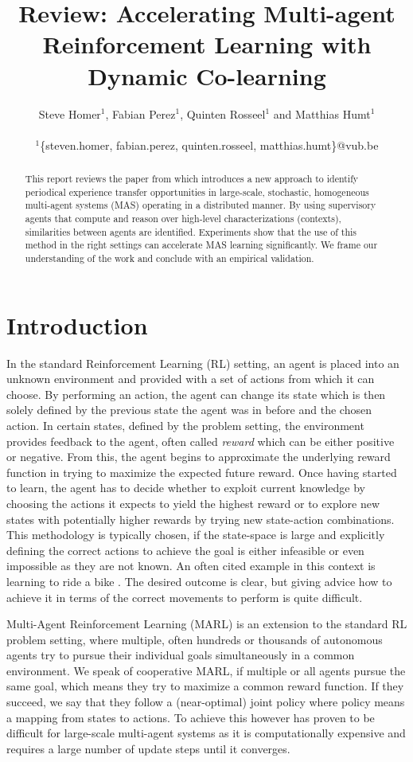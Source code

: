 \documentclass[letterpaper]{article}
\title{Review: Accelerating Multi-agent Reinforcement Learning
with Dynamic Co-learning}
\author{Steve Homer$^1$, Fabian Perez$^1$, Quinten Rosseel$^1$ and Matthias Humt$^1$ \\
\mbox{}\\
$^1$\{steven.homer, fabian.perez, quinten.rosseel, matthias.humt\}@vub.be}
\begin{document}
\maketitle

\begin{abstract} \label{sec:abstract}
 This report reviews the paper from \cite{garant2015accelerating} which introduces a new approach to identify periodical experience transfer opportunities in large-scale, stochastic, homogeneous multi-agent systems (MAS) operating in a distributed manner. By using supervisory agents that compute and reason over high-level characterizations (contexts), similarities between agents are identified. Experiments show that the use of this method in the right settings can accelerate MAS learning significantly. We frame our understanding of the work and conclude with an empirical validation.
\end{abstract}

\section{Introduction} \label{sec:introduction}
In the standard Reinforcement Learning (RL) setting, an agent is placed into an unknown environment and provided with a set of actions from which it can choose. By performing an action, the agent can change its state which is then solely defined by the previous state the agent was in before and the chosen action. In certain states, defined by the problem setting, the environment provides feedback to the agent, often called \textit{reward} which can be either positive or negative. From this, the agent begins to approximate the underlying reward function in trying to maximize the expected future reward. Once having started to learn, the agent has to decide whether to exploit current knowledge by choosing the actions it expects to yield the highest reward or to explore new states with potentially higher rewards by trying new state-action combinations. This methodology is typically chosen, if the state-space is large and explicitly defining the correct actions to achieve the goal is either infeasible or even impossible as they are not known. An often cited example in this context is learning to ride a bike \citep{randlov1998learning}. The desired outcome is clear, but giving advice how to achieve it in terms of the correct movements to perform is quite difficult.

Multi-Agent Reinforcement Learning (MARL) is an extension to the standard RL problem setting, where multiple, often hundreds or thousands of autonomous agents try to pursue their individual goals simultaneously in a common environment. We speak of cooperative MARL, if multiple or all agents pursue the same goal, which means they try to maximize a common reward function. If they succeed, we say that they follow a (near-optimal) joint policy where policy means a mapping from states to actions. To achieve this however has proven to be difficult for large-scale multi-agent systems as it is computationally expensive and requires a large number of update steps until it converges.
\end{document}
